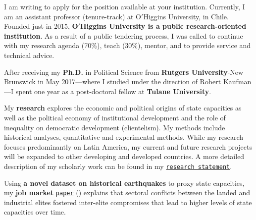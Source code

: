 \vspace{-0.3cm}I am writing to apply for the position available at your institution. Currently, I am an assistant professor (tenure-track) at O$'$Higgins University, in Chile. Founded just in 2015, {\bf O$'$Higgins University is a public research-oriented institution}. As a result of a public tendering process, I was called to continue with my research agenda (70\%), teach (30\%), mentor, and to provide service and technical advice.

After receiving my {\bf Ph.D.} in Political Science from {\bf Rutgers University}-New Brunswick in May 2017---where I studied under the direction of Robert Kaufman---I spent one year as a post-doctoral fellow at {\bf Tulane University}. 


My {\bf research} explores the economic and political origins of state capacities as well as the political economy of institutional development and the role of inequality on democratic development (clientelism). My methods include historical analyses, quantitative and experimental methods. While my research focuses predominantly on Latin America, my current and future research projects will be expanded to other developing and developed countries. A more detailed description of my scholarly work can be found in my \href{http://github.com/hbahamonde/Job_Market/raw/master/Bahamonde_Research_Statement.pdf}{\texttt{research statement}}.


Using {\bf a novel dataset on historical earthquakes} to proxy state capacities, my {\bf job market} \href{https://github.com/hbahamonde/Earthquake_Paper/raw/master/Bahamonde_Earthquake_Paper.pdf}{\texttt{paper}} (\emph{\unskip}) explains that sectoral conflicts between the landed and industrial elites fostered inter-elite compromises that lead to higher levels of state capacities over time. 

